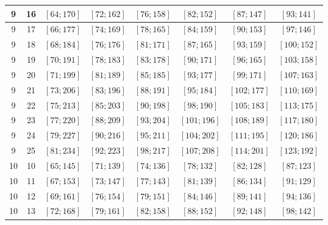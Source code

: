 \documentclass[a4paper,12pt]{article}
\begin{document}
\begin{center}
{\begin{longtable}[H]{|c|c|c|c|c|c|c|c|}
9 &  16 &  $\left[ 64; 170\right]$ &  $\left[ 72; 162\right]$ &  $\left[ 76; 158\right]$ &  $\left[ 82; 152\right]$ &  $\left[ 87; 147\right]$ &  $\left[ 93; 141\right]$ \tabularnewline \hline
9 &  17 &  $\left[ 66; 177\right]$ &  $\left[ 74; 169\right]$ &  $\left[ 78; 165\right]$ &  $\left[ 84; 159\right]$ &  $\left[ 90; 153\right]$ &  $\left[ 97; 146\right]$ \tabularnewline \hline
9 &  18 &  $\left[ 68; 184\right]$ &  $\left[ 76; 176\right]$ &  $\left[ 81; 171\right]$ &  $\left[ 87; 165\right]$ &  $\left[ 93; 159\right]$ &  $\left[ 100; 152\right]$ \tabularnewline \hline
9 &  19 &  $\left[ 70; 191\right]$ &  $\left[ 78; 183\right]$ &  $\left[ 83; 178\right]$ &  $\left[ 90; 171\right]$ &  $\left[ 96; 165\right]$ &  $\left[ 103; 158\right]$ \tabularnewline \hline
9 &  20 &  $\left[ 71; 199\right]$ &  $\left[ 81; 189\right]$ &  $\left[ 85; 185\right]$ &  $\left[ 93; 177\right]$ &  $\left[ 99; 171\right]$ &  $\left[ 107; 163\right]$ \tabularnewline \hline
9 &  21 &  $\left[ 73; 206\right]$ &  $\left[ 83; 196\right]$ &  $\left[ 88; 191\right]$ &  $\left[ 95; 184\right]$ &  $\left[ 102; 177\right]$ &  $\left[ 110; 169\right]$ \tabularnewline \hline
9 &  22 &  $\left[ 75; 213\right]$ &  $\left[ 85; 203\right]$ &  $\left[ 90; 198\right]$ &  $\left[ 98; 190\right]$ &  $\left[ 105; 183\right]$ &  $\left[ 113; 175\right]$ \tabularnewline \hline
9 &  23 &  $\left[ 77; 220\right]$ &  $\left[ 88; 209\right]$ &  $\left[ 93; 204\right]$ &  $\left[ 101; 196\right]$ &  $\left[ 108; 189\right]$ &  $\left[ 117; 180\right]$ \tabularnewline \hline
9 &  24 &  $\left[ 79; 227\right]$ &  $\left[ 90; 216\right]$ &  $\left[ 95; 211\right]$ &  $\left[ 104; 202\right]$ &  $\left[ 111; 195\right]$ &  $\left[ 120; 186\right]$ \tabularnewline \hline
9 &  25 &  $\left[ 81; 234\right]$ &  $\left[ 92; 223\right]$ &  $\left[ 98; 217\right]$ &  $\left[ 107; 208\right]$ &  $\left[ 114; 201\right]$ &  $\left[ 123; 192\right]$ \tabularnewline \hline
10 &  10 &  $\left[ 65; 145\right]$ &  $\left[ 71; 139\right]$ &  $\left[ 74; 136\right]$ &  $\left[ 78; 132\right]$ &  $\left[ 82; 128\right]$ &  $\left[ 87; 123\right]$ \tabularnewline \hline
10 &  11 &  $\left[ 67; 153\right]$ &  $\left[ 73; 147\right]$ &  $\left[ 77; 143\right]$ &  $\left[ 81; 139\right]$ &  $\left[ 86; 134\right]$ &  $\left[ 91; 129\right]$ \tabularnewline \hline
10 &  12 &  $\left[ 69; 161\right]$ &  $\left[ 76; 154\right]$ &  $\left[ 79; 151\right]$ &  $\left[ 84; 146\right]$ &  $\left[ 89; 141\right]$ &  $\left[ 94; 136\right]$ \tabularnewline \hline
10 &  13 &  $\left[ 72; 168\right]$ &  $\left[ 79; 161\right]$ &  $\left[ 82; 158\right]$ &  $\left[ 88; 152\right]$ &  $\left[ 92; 148\right]$ &  $\left[ 98; 142\right]$ \tabularnewline \hline

\end{longtable}}
\end{center}
\end{document}
